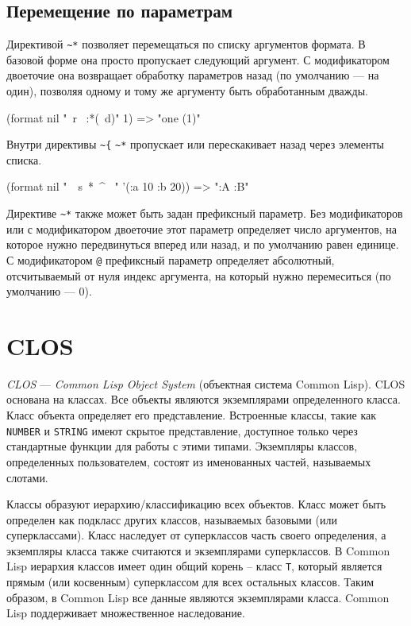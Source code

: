 \subsection{Перемещение по параметрам}
Директивой \lstinline{~*} позволяет перемещаться по списку аргументов формата. В базовой форме она просто пропускает следующий аргумент. С модификатором двоеточие она возвращает обработку параметров назад (по умолчанию — на один), позволяя одному и тому же аргументу быть обработанным дважды.
\begin{cllst}{}{}
(format nil "~r ~:*(~d)" 1) => "one (1)"
\end{cllst}

Внутри директивы \lstinline{~{} \lstinline{~*} пропускает или перескакивает назад через элементы списка.
\begin{cllst}{}{}
(format nil "~{~s~*~^ ~}" '(:a 10 :b 20)) => ":A :B"
\end{cllst}

Директиве \lstinline{~*} также может быть задан префиксный параметр. Без модификаторов или с модификатором двоеточие этот параметр определяет число аргументов, на которое нужно передвинуться вперед или назад, и по умолчанию равен единице. С модификатором \lstinline{@} префиксный параметр определяет абсолютный, отсчитываемый от нуля индекс аргумента, на который нужно перемеситься (по умолчанию — $0$).

\section{CLOS}
\emph{CLOS} — \emph{Common Lisp Object System} (объектная система Common Lisp). CLOS основана на классах. Все объекты являются экземплярами определенного класса. Класс объекта определяет его представление. Встроенные классы, такие как \lstinline{NUMBER} и \lstinline{STRING} имеют скрытое представление, доступное только через стандартные функции для работы с этими типами. Экземпляры классов, определенных пользователем, состоят из именованных частей, называемых слотами.

Классы образуют иерархию/классификацию всех объектов. Класс может быть определен как подкласс других классов, называемых базовыми (или суперклассами). Класс наследует от суперклассов часть своего определения, а экземпляры класса также считаются и экземплярами суперклассов. В Common Lisp иерархия классов имеет один общий корень – класс \lstinline{T}, который является прямым (или косвенным) суперклассом для всех остальных классов. Таким образом, в Common Lisp все данные являются экземплярами класса. Common Lisp поддерживает множественное наследование.

